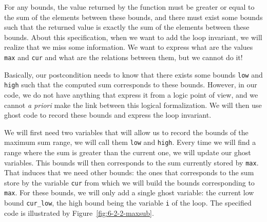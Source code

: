 \documentclass[12pt,francais,]{scrbook}
\begin{document}
For any bounds, the value returned by the function must be greater or
equal to the sum of the elements between these bounds, and there must
exist some bounds such that the returned value is exactly the sum of the
elements between these bounds. About this specification, when we want to
add the loop invariant, we will realize that we miss some information.
We want to express what are the values \texttt{max} and \texttt{cur} and
what are the relations between them, but we cannot do it!

Basically, our postcondition needs to know that there exists some bounds
\texttt{low} and \texttt{high} such that the computed sum corresponds to
these bounds. However, in our code, we do not have anything that express
it from a logic point of view, and we cannot \emph{a priori} make the
link between this logical formalization. We will then use ghost code to
record these bounds and express the loop invariant.

We will first need two variables that will allow us to record the bounds
of the maximum sum range, we will call them \texttt{low} and
\texttt{high}. Every time we will find a range where the sum is greater
than the current one, we will update our ghost variables. This bounds
will then corresponds to the sum currently stored by \texttt{max}. That
induces that we need other bounds: the ones that corresponds to the sum
store by the variable \texttt{cur} from which we will build the bounds
corresponding to \texttt{max}. For these bounds, we will only add a
single ghost variable: the current low bound \texttt{cur\_low}, the high
bound being the variable \texttt{i} of the loop. The specified code is
illustrated by Figure~\ref{fig:6-2-2-maxsub}.
\end{document}
